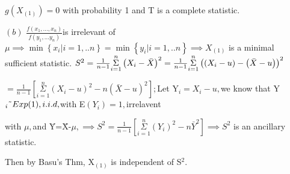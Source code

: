 \documentclass{article}
\begin{document}
$g\left( X_{\left( 1\right) }\right) =0$ with probability 1 and T is a
complete statistic.

$\left( b\right) $ $\frac{f\left( x_{1},...,x_{n}\right) }{f\left(
y_{1},...y_{n}\right) }$is irrelevant of $\mu \implies \min \left\{
x_{i}|i=1,..n\right\} =\min \left\{ y_{i}|i=1,..n\right\} \implies X_{\left(
1\right) }$ is a minimal sufficient statistic. $S^{2}=\frac{1}{n-1}\underset{%
i=1}{\overset{n}{\Sigma }}\left( X_{i}-\bar{X}\right) ^{2}=\frac{1}{n-1}%
\underset{i=1}{\overset{n}{\Sigma }}\left( \left( X_{i}-u\right) -\left( 
\bar{X}-u\right) \right) ^{2}$

$=\frac{1}{n-1}\left[ \underset{i=1}{\overset{n}{\Sigma }}\left(
X_{i}-u\right) ^{2}-n\left( \bar{X}-u\right) ^{2}\right] ;$Let Y$%
_{i}=X_{i}-u,$we know that Y$_{i}\symbol{126}Exp(1),i.i.d,$with E$\left(
Y_{i}\right) =1,$irrelavent

with $\mu ,$and \={Y}=\={X}-$\mu ,\implies S^{2}=\frac{1}{n-1}\left[ 
\underset{i=1}{\overset{n}{\Sigma }}\left( Y_{i}\right) ^{2}-n\bar{Y}^{2}%
\right] \implies S^{2}$ is an ancillary statistic.

Then by Basu's Thm, X$_{\left( 1\right) }$ is independent of S$^{2}.$
\end{document}
